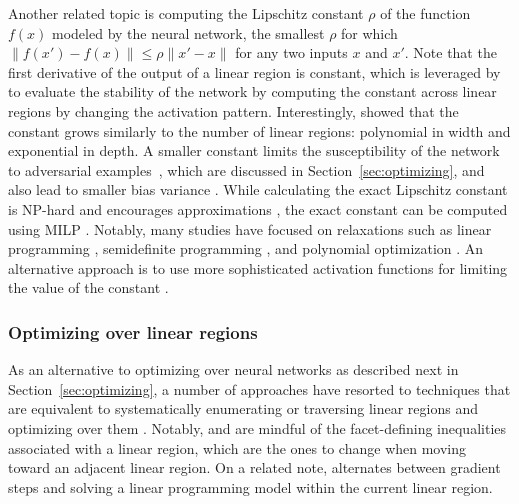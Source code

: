 Another related topic is computing the Lipschitz constant $\rho$ of the function $f(x)$ modeled by the neural network, 
the smallest $\rho$ for which $\| f(x') - f(x) \| \leq \rho \| x' - x \|$ for any two inputs $x$ and $x'$. 
Note that the first derivative of the output of a linear region is constant, 
which is leveraged by~\cite{hwang2020unrectifying} to evaluate the stability of the network by computing the constant across linear regions by changing the activation pattern. 
Interestingly, \cite{zhou2019lipschitz} showed that the constant grows similarly to the number of linear regions: polynomial in width and exponential in depth. 
A smaller constant limits the susceptibility of the network to adversarial examples~\citep{huster2018limitations}, which are discussed in Section~\ref{sec:optimizing}, 
and also lead to smaller bias variance \citep{loukas2021training}. 
While calculating the exact Lipschitz constant is NP-hard and encourages approximations \citep{scaman2018lipschitz,combettes2019certificates}, 
the exact constant can be computed using MILP \citep{jordan2020exact}. 
Notably, 
many studies have focused on relaxations such as linear programming \citep{zou2019cnnlp}, semidefinite programming \citep{fazlyab2019sdp,chen2020sdp}, and polynomial optimization \citep{latorre2020polynomial}. 
An alternative approach is to use more sophisticated activation functions for limiting the value of the constant \citep{anil2019groupsort,aziznejad2020controledlipschitz}. 



\subsubsection{Optimizing over linear regions}

As an alternative to optimizing over neural networks as described next in Section~\ref{sec:optimizing}, 
a number of approaches have resorted to techniques that are equivalent to systematically enumerating or traversing linear regions and optimizing over them \citep{croce2018gcpr,croce2020ijcv,khedr2020verification,vincent2021icra,xu2022advml}.
Notably, \cite{vincent2021icra} and \cite{xu2022advml} are mindful of the facet-defining inequalities associated with a linear region, 
which are the ones to change when moving toward an adjacent linear region. 
On a related note, 
\cite{seck2021lp} alternates between gradient steps and solving a linear programming model within the current linear region.

